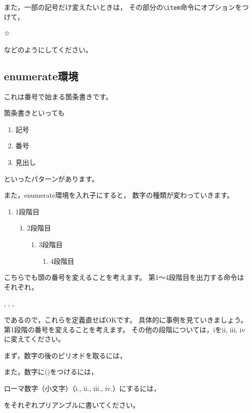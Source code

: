 また，一部の記号だけ変えたいときは，
その部分の\verb|\item|命令にオプションをつけて，
\begin{ITeX}
\item[☆]
\end{ITeX}
などのようにしてください。


\subsection{enumerate環境}
これは番号で始まる箇条書きです。

\begin{IOTeX}
箇条書きといっても
\begin{enumerate}
\item 記号
\item 番号
\item 見出し
\end{enumerate}
といったパターンがあります。
\end{IOTeX}

また，enumerate環境を入れ子にすると，
数字の種類が変わっていきます。

\begin{IOTeX}
\begin{enumerate}
\item 1段階目
  \begin{enumerate}
  \item 2段階目
       \begin{enumerate}
       \item 3段階目
           \begin{enumerate}
           \item 4段階目
           \end{enumerate}
        \end{enumerate}
  \end{enumerate}
\end{enumerate}
\end{IOTeX}

こちらでも頭の番号を変えることを考えます。
第1～4段階目を出力する命令はそれぞれ，
\begin{ITeX}
, , , 
\end{ITeX}
であるので，これらを定義直せばOKです。
具体的に事例を見ていきましょう。
第1段階の番号を変えることを考えます。
その他の段階については，iをii, iii, ivに変えてください。

まず，数字の後のピリオドを取るには，
\begin{ITeX}
\renewcommand{\labelitemi}{\theenumi}
\end{ITeX}
また，数字に()をつけるには，
\begin{ITeX}
\renewcommand{\labelitemi}{(\theenumi)}
\end{ITeX}
ローマ数字（小文字）（i., ii., iii., iv.）にするには，
\begin{ITeX}
\renewcommand{\theenumi}{\roman{enumi}}
\end{ITeX}
をそれぞれプリアンブルに書いてください。

